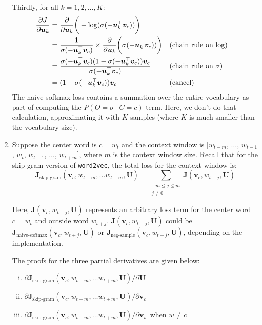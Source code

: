 \begin{enumerate}
\begin{answer}
                Thirdly, for all $k=1,2,\dots,K$:
                \begin{equation*}
                \begin{aligned}
                    {\partial J \over \partial \bm u_{k}} &=
                    {\partial \over \partial \bm u_k} \bigg( -\log(\sigma(- \bm u_k^\top \bm v_c)) \bigg) \\
                    &=
                    \frac{1}{\sigma(- \bm u_k^\top \bm v_c)} \times {\partial \over \partial \bm u_k} \bigg(\sigma(- \bm u_k^\top \bm v_c)) \bigg) && \text{(chain rule on $\log$)} \\
                    &= \frac{\sigma(-\bm u_k^\top \bm v_c) (1 - \sigma(-\bm u_k^\top \bm v_c))\bm v_c}{\sigma(-\bm u_k^\top \bm v_c)} && \text{(chain rule on $\sigma$)} \\
                    &= (1 - \sigma(-\bm u_{k}^\top \bm v_c)) \bm v_c && \text{(cancel)}
                \end{aligned}
                \end{equation*}
                The naive-softmax loss contains a summation over the entire vocabulary as part of computing the $P(O = o \mid C = c)$ term. Here, we don't do that calculation, approximating it with $K$ samples (where $K$ is much smaller than the vocabulary size).
        \end{answer}

    \item Suppose the center word is $c = w_t$ and the context window is $[w_{t-m}$, $\ldots$, $w_{t-1}$, $w_{t}$, $w_{t+1}$, $\ldots$, $w_{t+m}]$, where $m$ is the context window size. Recall that for the  skip-gram version of {\tt word2vec}, the total loss for the context window is:
        \begin{equation}
        \bm J_{\textrm{skip-gram}}(\bm v_c, w_{t-m},\ldots w_{t+m}, \bm U) = \sum_{\substack{-m\le j \le m \\ j\ne 0}} \bm J(\bm v_c, w_{t+j}, \bm U)
        \end{equation}
        
        Here, $\bm J(\bm v_c, w_{t+j}, \bm U)$ represents an arbitrary loss term for the center word $c=w_t$ and outside word $w_{t+j}$. $\bm J(\bm v_c, w_{t+j}, \bm U)$ could be $\bm J_{\text{naive-softmax}}(\bm v_c, w_{t+j}, \bm U)$ or $\bm J_{\text{neg-sample}}(\bm v_c, w_{t+j}, \bm U)$, depending on the implementation.
        
        The proofs for the three partial derivatives are given below: 
        \begin{enumerate}[(i)]
            \item ${\partial \bm J_{\textrm{skip-gram}}(\bm v_c, w_{t-m},\ldots w_{t+m}, \bm U) / \partial \bm U}$
            \item ${\partial \bm J_{\textrm{skip-gram}}(\bm v_c, w_{t-m},\ldots w_{t+m}, \bm U) / \partial \bm v_c}$
            \item ${\partial \bm J_{\textrm{skip-gram}}(\bm v_c, w_{t-m},\ldots w_{t+m}, \bm U) / \partial \bm v_w}$ when $w \ne c$
        \end{enumerate}
        

\end{enumerate}
